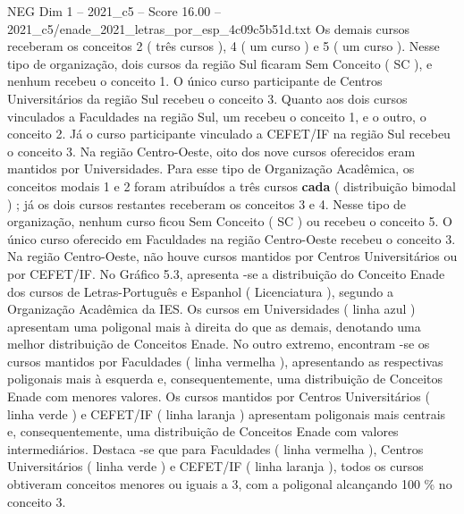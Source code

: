 \begin{textsample}{NEG Dim 1 – 2021\_c5 – Score 16.00 – 2021\_c5/enade\_2021\_letras\_por\_esp\_4c09c5b51d.txt}
Os demais cursos receberam os conceitos 2 ( três cursos ), 4 ( um curso ) e 5 ( um curso ).
Nesse tipo de organização, dois cursos da região Sul ficaram Sem Conceito ( SC ), e nenhum recebeu o conceito 1.
O único curso participante de Centros Universitários da região Sul recebeu o conceito 3.
Quanto aos dois cursos vinculados a Faculdades na região Sul, um recebeu o conceito 1, e o outro, o conceito 2.
Já o curso participante vinculado a CEFET/IF na região Sul recebeu o conceito 3.
Na região Centro-Oeste, oito dos nove cursos oferecidos eram mantidos por Universidades.
Para esse tipo de Organização Acadêmica, os conceitos modais 1 e 2 foram atribuídos a três cursos \textbf{cada} ( distribuição bimodal ) ; já os dois cursos restantes receberam os conceitos 3 e 4.
Nesse tipo de organização, nenhum curso ficou Sem Conceito ( SC ) ou recebeu o conceito 5.
O único curso oferecido em Faculdades na região Centro-Oeste recebeu o conceito 3.
Na região Centro-Oeste, não houve cursos mantidos por Centros Universitários ou por CEFET/IF.
No Gráfico 5.3, apresenta -se a distribuição do Conceito Enade dos cursos de Letras-Português e Espanhol ( Licenciatura ), segundo a Organização Acadêmica da IES.
Os cursos em Universidades ( linha azul ) apresentam uma poligonal mais à direita do que as demais, denotando uma melhor distribuição de Conceitos Enade.
No outro extremo, encontram -se os cursos mantidos por Faculdades ( linha vermelha ), apresentando as respectivas poligonais mais à esquerda e, consequentemente, uma distribuição de Conceitos Enade com menores valores.
Os cursos mantidos por Centros Universitários ( linha verde ) e CEFET/IF ( linha laranja ) apresentam poligonais mais centrais e, consequentemente, uma distribuição de Conceitos Enade com valores intermediários.
Destaca -se que para Faculdades ( linha vermelha ), Centros Universitários ( linha verde ) e CEFET/IF ( linha laranja ), todos os cursos obtiveram conceitos menores ou iguais a 3, com a poligonal alcançando 100 \% no conceito 3.

\end{textsample}
